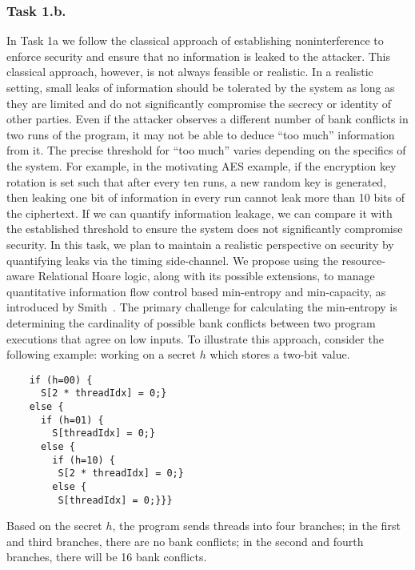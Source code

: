 \subsubsection{Task 1.b.}
In Task 1a we follow the classical approach of establishing noninterference to enforce security and ensure that no information is leaked to the attacker. This classical approach, however, is not always feasible or realistic. 
%
In a realistic setting, small leaks of information should be tolerated by the system as long as they are limited and do not significantly compromise the secrecy or identity of other parties.
% 
Even if the attacker observes a different number of bank conflicts in two runs of the program, it may not be able to deduce ``too much'' information from it. 
%
The precise threshold for “too much'' varies depending on the specifics of the system. 
%
For example, in the motivating AES example, if the encryption key rotation is set such that after every ten runs, a new random key is generated, then leaking one bit of information in every run cannot leak more than 10 bits of the ciphertext.
%
If we can quantify information leakage, we can compare it with the established threshold to ensure the system does not significantly compromise security.
%
In this task, we plan to maintain a realistic perspective on security by quantifying leaks via the timing side-channel.
%
We propose using the resource-aware Relational Hoare logic, along with its possible extensions, to manage quantitative information flow control based min-entropy and min-capacity, as introduced by Smith~\cite{smith2011ICQE}.
%
The primary challenge for calculating the min-entropy is determining the cardinality of possible bank conflicts between two program executions that agree on low inputs.
%
To illustrate this approach, consider the following example: working on a secret $h$ which stores a two-bit value.
\begin{lstlisting}
    if (h=00) {
      S[2 * threadIdx] = 0;} 
    else {
      if (h=01) {
        S[threadIdx] = 0;}
      else {
        if (h=10) {
         S[2 * threadIdx] = 0;}
        else {
         S[threadIdx] = 0;}}}
\end{lstlisting}
Based on the secret $h$, the program sends threads into four branches; in the first and third branches, there are no bank conflicts; in the second and fourth branches, there will be 16 bank conflicts.
%
